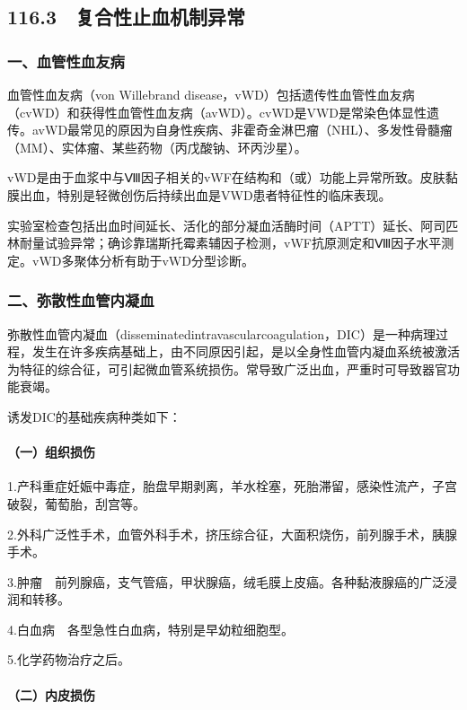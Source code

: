 \protect\hypertarget{text00267.html}{}{}

\subsection{116.3　复合性止血机制异常}

\subsubsection{一、血管性血友病}

血管性血友病（von Willebrand
disease，vWD）包括遗传性血管性血友病（cvWD）和获得性血管性血友病（avWD）。cvWD是VWD是常染色体显性遗传。avWD最常见的原因为自身性疾病、非霍奇金淋巴瘤（NHL）、多发性骨髓瘤（MM）、实体瘤、某些药物（丙戊酸钠、环丙沙星）。

vWD是由于血浆中与Ⅷ因子相关的vWF在结构和（或）功能上异常所致。皮肤黏膜出血，特别是轻微创伤后持续出血是VWD患者特征性的临床表现。

实验室检查包括出血时间延长、活化的部分凝血活酶时间（APTT）延长、阿司匹林耐量试验异常；确诊靠瑞斯托霉素辅因子检测，vWF抗原测定和Ⅷ因子水平测定。vWD多聚体分析有助于vWD分型诊断。

\subsubsection{二、弥散性血管内凝血}

弥散性血管内凝血（disseminatedintravascularcoagulation，DIC）是一种病理过程，发生在许多疾病基础上，由不同原因引起，是以全身性血管内凝血系统被激活为特征的综合征，可引起微血管系统损伤。常导致广泛出血，严重时可导致器官功能衰竭。

诱发DIC的基础疾病种类如下：

\paragraph{（一）组织损伤}

1.产科重症妊娠中毒症，胎盘早期剥离，羊水栓塞，死胎滞留，感染性流产，子宫破裂，葡萄胎，刮宫等。

2.外科广泛性手术，血管外科手术，挤压综合征，大面积烧伤，前列腺手术，胰腺手术。

3.肿瘤　前列腺癌，支气管癌，甲状腺癌，绒毛膜上皮癌。各种黏液腺癌的广泛浸润和转移。

4.白血病　各型急性白血病，特别是早幼粒细胞型。

5.化学药物治疗之后。

\paragraph{（二）内皮损伤}

